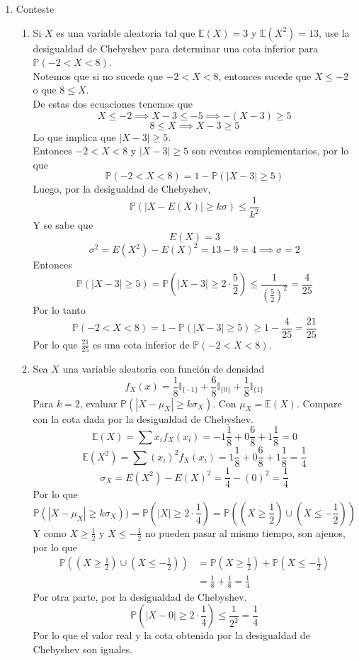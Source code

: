 \documentclass[12pt,a4paper]{report}
\begin{document}
\begin{enumerate}
		\item{
			Conteste
			\begin{enumerate}
				\item {
					Si $X$ es una variable aleatoria tal que
					$\mathbb{E}(X) = 3$ y $\mathbb{E}(X^2) = 13$, use la
					desigualdad de Chebyshev para determinar una cota inferior
					para $\mathbb{P}(-2 < X < 8)$.\\
					Notemos que si no sucede que $-2 < X < 8$, entonces  sucede que
					$X \leq -2$ o que $8 \leq X$.\\
					De estas dos ecuaciones tenemos que
					\[X \leq -2 \implies X - 3 \leq -5 \implies -(X - 3) \geq 5\]
					\[ 8 \leq X \implies X - 3 \geq 5\]
					Lo que implica que $|X-3| \geq 5$.\\
					Entonces $-2 < X < 8$ y $|X-3| \geq 5$ son eventos
					complementarios, por lo que
					\[\mathbb{P}(-2 < X < 8) = 1 - \mathbb{P}(|X-3| \geq 5)\]
					Luego, por la desigualdad de Chebyshev,
					\[\mathbb{P}(|X-E(X)| \geq k\sigma) \leq \frac{1}{k^2}\]
					Y se sabe que
					\[E(X) = 3\]
					\[\sigma ^2 = E(X^2) - E(X)^2 = 13 - 9 = 4 \implies \sigma = 2\]
					Entonces
					\[\mathbb{P}(|X-3| \geq 5) = \mathbb{P}(|X-3| \geq 2\cdot \frac{5}{2})
					 \leq \frac{1}{(\frac{5}{2})^2} = \frac{4}{25}\]
					Por lo tanto
					\[\mathbb{P}(-2 < X < 8) = 1 - \mathbb{P}(|X-3| \geq 5)
					\geq 1 - \frac{4}{25} = \frac{21}{25}\]
					Por lo que $\frac{21}{25}$ es una cota inferior de
					$\mathbb{P}(-2 < X < 8)$.
				}

				\item {
					Sea $X$ una variable aleatoria con función de densidad
					\[
					f_X(x) = \frac{1}{8}\mathbb{I}_{\{-1\}} +
					\frac{6}{8}\mathbb{I}_{\{0\}} +
					\frac{1}{8}\mathbb{I}_{\{1\}}
					\]
					Para $k = 2$, evaluar
					$\mathbb{P}(|X-\mu_X| \geq k\sigma_X)$. Con
					$\mu_X = \mathbb{E}(X)$. Compare con la cota dada por la
					desigualdad de Chebyshev.
					\[\mathbb{E}(X) = \sum{x_i f_X(x_i)} = -1\frac{1}{8}
					+ 0 \frac{6}{8} + 1 \frac{1}{8} = 0\]
					\[\mathbb{E}(X^2) = \sum{(x_i)^2 f_X(x_i)} = 1\frac{1}{8}
					+ 0 \frac{6}{8} + 1 \frac{1}{8} = \frac{1}{4}\]
					\[\sigma_X = E(X^2) - E(X)^2 = \frac{1}{4} - (0)^2 = \frac{1}{4}\]
					Por lo que
					\[\mathbb{P}(|X-\mu_X| \geq k\sigma_X)) =
					\mathbb{P}(|X| \geq 2 \cdot \frac{1}{4})
					= \mathbb{P}((X \geq \frac{1}{2}) \cup (X \leq -\frac{1}{2}))\]
					Y como $X \geq \frac{1}{2}$ y $X \leq -\frac{1}{2}$ no
					pueden pasar al mismo tiempo, son ajenos, por lo que
					\begin{align*}
						\mathbb{P}((X \geq \frac{1}{2}) \cup (X \leq -\frac{1}{2}))
						&= \mathbb{P}(X \geq \frac{1}{2})
						+ \mathbb{P}(X \leq -\frac{1}{2})\\
						&= \frac{1}{8} + \frac{1}{8} = \frac{1}{4}
					\end{align*}
					Por otra parte, por la desigualdad de Chebyshev.
					\[\mathbb{P}(|X-0| \geq 2 \cdot \frac{1}{4}) \leq \frac{1}{2^2}
					= \frac{1}{4} \]
					Por lo que el valor real y la cota obtenida por la
					desigualdad de Chebyshev son iguales.
				}


\end{enumerate}}
\end{enumerate}
\end{document}
